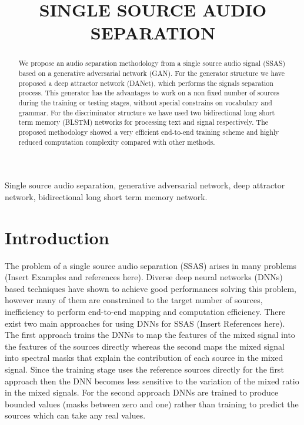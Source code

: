 \documentclass{article}
\title{SINGLE SOURCE AUDIO SEPARATION}
\begin{document}
%
\maketitle
%
\begin{abstract}
We propose an audio separation methodology from a single source audio signal (SSAS) based on a generative adversarial network (GAN).  For the generator structure we have proposed a deep attractor network (DANet), which performs the signals separation process. This generator has the advantages to work on a non fixed number of sources during the training or testing stages, without special constrains on  vocabulary and grammar. For the discriminator  structure we have used two bidirectional long short term memory (BLSTM) networks for processing text and signal respectively. 
The proposed methodology showed a very efficient end-to-end training scheme and highly reduced  computation complexity compared with other methods.

\end{abstract}
%
\begin{keywords}
Single source audio separation, generative adversarial network, deep attractor network, bidirectional long short term memory network.
\end{keywords}
%
\section{Introduction}
The problem of a single source audio separation (SSAS) arises in many problems (Insert Examples and references here). Diverse deep neural networks (DNNs) based techniques have shown  to achieve good performances solving this problem, however many of them are constrained to the target number of sources,  inefficiency to perform end-to-end mapping and computation efficiency. There exist two main approaches for using DNNs  for SSAS (Insert References here). The first approach trains the DNNs to map the features of the mixed signal into the features of the sources directly whereas the second maps the mixed signal into spectral masks that explain the contribution of each source in the mixed signal. 
Since the training stage uses the reference sources directly for the first approach then the DNN becomes less sensitive to the variation of the mixed ratio in the mixed signals. For the second approach DNNs are trained to produce bounded values (masks between zero and one) rather than training to predict the sources which can take any real values.
\end{document}
